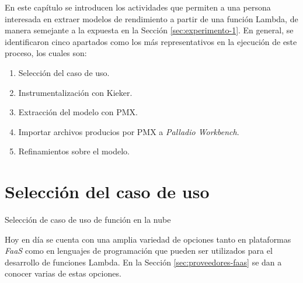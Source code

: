 En este capítulo se introducen los actividades que permiten a una persona interesada en extraer modelos de rendimiento a partir de una función Lambda, de manera semejante a la expuesta en la Sección \ref{sec:experimento-1}. En general, se identificaron cinco apartados como los más representativos en la ejecución de este proceso, los cuales son:
\begin{enumerate}
    \item Selección del caso de uso.
    \item Instrumentalización con Kieker.
    \item Extracción del modelo con PMX.
    \item Importar archivos producios por PMX a \emph{Palladio Workbench}.
    \item Refinamientos sobre el modelo.
\end{enumerate}

\section{Selección del caso de uso}

\begin{singlespace}
\begin{algorithm}[H]
\SetAlgoLined

\caption{Selección de caso de uso de función en la nube}
\end{algorithm}
\end{singlespace}

Hoy en día se cuenta con una amplia variedad de opciones tanto en plataformas \emph{FaaS} como en lenguajes de programación que pueden ser utilizados para el desarrollo de funciones Lambda. En la Sección \ref{sec:proveedores-faas} se dan a conocer varias de estas opciones.

